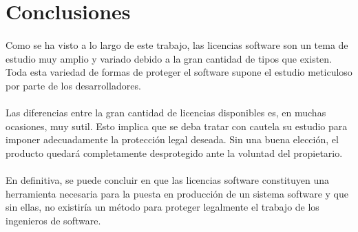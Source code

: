 \documentclass[10pt]{article}
\begin{document}
    \newpage
    
    \section{Conclusiones}
    
    	\paragraph{}
        Como se ha visto a lo largo de este trabajo, las licencias software son un tema de estudio muy amplio y variado debido a la gran cantidad de tipos que existen. Toda esta variedad de formas de proteger el software supone el estudio meticuloso por parte de los desarrolladores.

        \paragraph{}
        Las diferencias entre la gran cantidad de licencias disponibles es, en muchas ocasiones, muy sutil. Esto implica que se deba tratar con cautela su estudio para imponer adecuadamente la protección legal deseada. Sin una buena elección, el producto quedará completamente desprotegido ante la voluntad del propietario.
        
        \paragraph{}
        En definitiva, se puede concluir en que las licencias software constituyen una herramienta necesaria para la puesta en producción de un sistema software y que sin ellas, no existiría un método para proteger legalmente el trabajo de los ingenieros de software.
        
\end{document}
